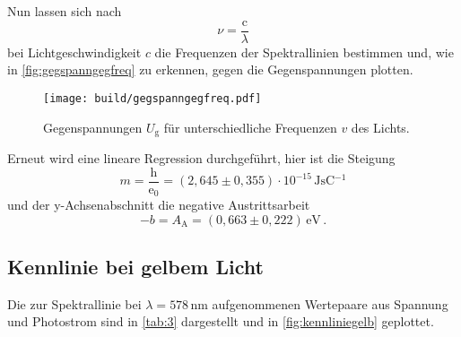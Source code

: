 Nun lassen sich nach
\begin{equation*}
    \nu = \dfrac{\text{c}}{\lambda}
\end{equation*}
bei Lichtgeschwindigkeit $c$ die Frequenzen der Spektrallinien bestimmen und, wie in \autoref{fig:gegspanngegfreq} zu erkennen, gegen die Gegenspannungen plotten.

\begin{figure}
    \centering
    \texttt{[image: build/gegspanngegfreq.pdf]}
    \caption{Gegenspannungen $U_\text{g}$ für unterschiedliche Frequenzen $v$ des Lichts.}
    \label{fig:gegspanngegfreq}
\end{figure}

Erneut wird eine lineare Regression durchgeführt, hier ist die Steigung
\begin{equation*}
    m = \dfrac{\text{h}}{\text{e}_0} = (2,645 \pm 0,355) \cdot 10^{-15} \,\si{\joule\second\coulomb^{-1}}
\end{equation*}
und der y-Achsenabschnitt die negative Austrittsarbeit 
\begin{equation*}
    -b = A_\text{A} = (0,663 \pm 0,222) \,\si{\eV} \,.
\end{equation*}


\subsection{Kennlinie bei gelbem Licht}

Die zur Spektrallinie bei $\lambda = 578 \,\si{\nano\meter}$ aufgenommenen Wertepaare aus Spannung und Photostrom sind in \autoref{tab:3} dargestellt und in \autoref{fig:kennliniegelb} geplottet.

